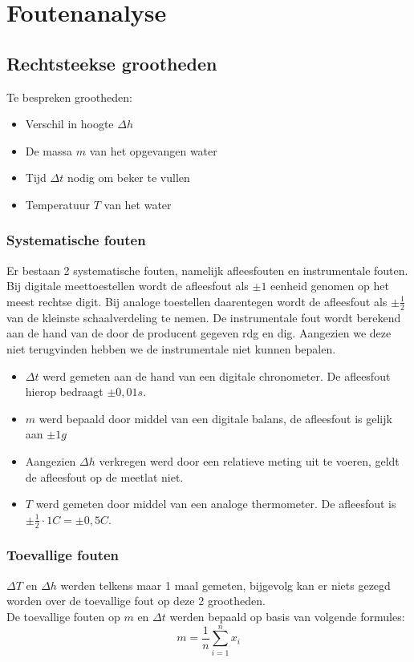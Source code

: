 \section{Foutenanalyse}

\subsection{Rechtsteekse grootheden}

Te bespreken grootheden:
\begin{itemize}
    \item Verschil in hoogte $\Delta h$
    \item De massa $m$ van het opgevangen water
    \item Tijd $\Delta t$ nodig om beker te vullen
    \item Temperatuur $T$ van het water
\end{itemize}

\subsubsection{Systematische fouten}
Er bestaan 2 systematische fouten, namelijk afleesfouten en instrumentale fouten. Bij digitale meettoestellen wordt de afleesfout als $\pm 1$ eenheid genomen op het meest rechtse digit. 
Bij analoge toestellen daarentegen wordt de afleesfout als $\pm \frac{1}{2}$ van de kleinste schaalverdeling te nemen. De instrumentale fout wordt berekend aan de hand van de door de producent gegeven rdg en dig. Aangezien we deze niet terugvinden hebben we de instrumentale niet kunnen bepalen.
\begin{itemize}
    \item $\Delta t$ werd gemeten aan de hand van een digitale chronometer. De afleesfout hierop bedraagt $\pm 0,01 s$.
    \item $m$ werd bepaald door middel van een digitale balans, de afleesfout is gelijk aan $\pm 1g$
    \item Aangezien $\Delta h$ verkregen werd door een relatieve meting uit te voeren, geldt de afleesfout op de meetlat niet.
    \item $T$ werd gemeten door middel van een analoge thermometer. De afleesfout is $\pm \frac{1}{2} \cdot 1C = \pm 0,5C$.
\end{itemize} 




\subsubsection{Toevallige fouten}
$\Delta T$ en $\Delta h$ werden telkens maar 1 maal gemeten, bijgevolg kan er niets gezegd worden over de toevallige fout op deze 2 grootheden.
\\
De toevallige fouten op $m$ en $\Delta t$ werden bepaald op basis van volgende formules:
\begin{equation}
    m = \frac{1}{n} \sum\limits_{i=1}^n x_i
\end{equation}

